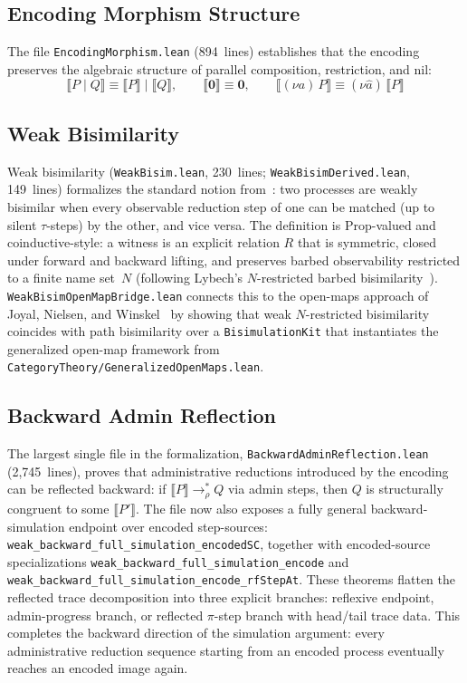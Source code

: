 \documentclass[11pt]{article}
\theoremstyle{definition}
\theoremstyle{remark}
\begin{document}
\subsection{Encoding Morphism Structure}

The file \texttt{EncodingMorphism.lean} (894~lines) establishes that
the encoding preserves the algebraic structure of parallel composition,
restriction, and nil:
\[
  \llbracket P \mathbin{|} Q \rrbracket \equiv \llbracket P \rrbracket \mathbin{|} \llbracket Q \rrbracket, \qquad
  \llbracket \mathbf{0} \rrbracket \equiv \mathbf{0}, \qquad
  \llbracket (\nu a)\, P \rrbracket \equiv (\nu \hat{a})\, \llbracket P \rrbracket
\]

\subsection{Weak Bisimilarity}

Weak bisimilarity (\texttt{WeakBisim.lean}, 230~lines;
\texttt{WeakBisimDerived.lean}, 149~lines) formalizes the standard
notion from~\cite{SangiorgiWalker2001}: two processes are weakly
bisimilar when every observable reduction step of one can be matched
(up to silent $\tau$-steps) by the other, and vice versa.
The definition is Prop-valued and coinductive-style: a witness is an
explicit relation $R$ that is symmetric, closed under forward and
backward lifting, and preserves barbed observability restricted to a
finite name set~$N$ (following Lybech's $N$-restricted barbed
bisimilarity~\cite{Lybech2022}).
\texttt{WeakBisimOpenMapBridge.lean} connects this to the open-maps
approach of Joyal, Nielsen, and Winskel~\cite{JoyalNielsenWinskel1996}
by showing that weak $N$-restricted bisimilarity coincides with
path bisimilarity over a \texttt{BisimulationKit} that instantiates the
generalized open-map framework from
\texttt{CategoryTheory/GeneralizedOpenMaps.lean}.

\subsection{Backward Admin Reflection}

The largest single file in the formalization,
\texttt{BackwardAdminReflection.lean} (2{,}745~lines), proves that
administrative reductions introduced by the encoding can be reflected
backward: if $\llbracket P \rrbracket \to_\rho^* Q$ via admin steps,
then $Q$ is structurally congruent to some $\llbracket P' \rrbracket$.
The file now also exposes a fully general backward-simulation endpoint over
encoded step-sources:
\texttt{weak\_backward\_full\_simulation\_encodedSC}, together with encoded-source
specializations
\texttt{weak\_backward\_full\_simulation\_encode} and
\texttt{weak\_backward\_full\_simulation\_encode\_rfStepAt}.
These theorems flatten the reflected trace decomposition into three explicit
branches: reflexive endpoint, admin-progress branch, or reflected $\pi$-step
branch with head/tail trace data.  This completes the backward direction of
the simulation argument: every administrative reduction sequence starting
from an encoded process eventually reaches an encoded image again.
\end{document}
